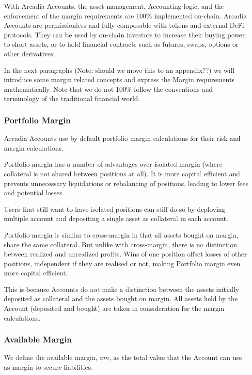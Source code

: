 \documentclass[sigconf,nonacm]{acmart}
\begin{document}
With Arcadia Accounts, the asset management, Accounting logic, and the enforcement of the margin requirements are 100\% implemented on-chain.
Arcadia Accounts are permissionless and fully composable with tokens and external DeFi protocols.
They can be used by on-chain investors to increase their buying power, to short assets, or to hold financial contracts such as futures, swaps, options or other derivatives.

In the next paragraphs (Note: should we move this to an appendix??) we will introduce some margin related concepts and express the Margin requirements mathematically.
Note that we do not 100\% follow the conventions and terminology of the traditional financial world.

\subsubsection{Portfolio Margin}
Arcadia Accounts use by default portfolio margin calculations for their risk and margin calculations.

Portfolio margin has a number of advantages over isolated margin (where collateral is not shared between positions at all).
It is more capital efficient and prevents unnecessary liquidations or rebalancing of positions, leading to lower fees and potential losses.

Users that still want to have isolated positions can still do so by deploying multiple account and depositing a single asset as collateral in each account.

Portfolio margin is similar to cross-margin in that all assets bought on margin, share the same collateral.
But unlike with cross-margin, there is no distinction between realized and unrealized profits.
Wins of one position offset losses of other positions, independent if they are realised or not,
making Portfolio margin even more capital efficient.

This is because Accounts do not make a distinction between the assets initially deposited as collateral and the assets bought on margin.
All assets held by the Account (deposited and bought) are taken in consideration for the margin calculations.

\subsubsection{Available Margin}
\label{subsubsec:available-margin}
We define the available margin, $am$, as the total value that the Account can use as margin to secure liabilities.
\end{document}
